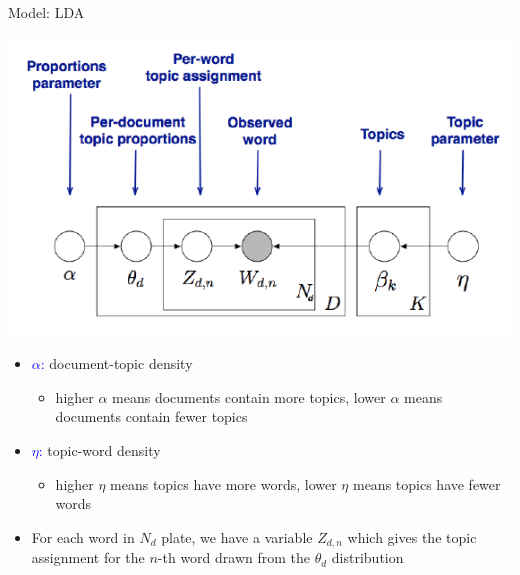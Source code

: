 \documentclass[english]{beamer}
\begin{document}
\begin{frame}{Model: LDA}
\begin{center}
\includegraphics[scale=0.4]{Images/platenotation2.png}
\end{center}
\begin{itemize}
\item \textcolor{blue}{$\alpha$:} document-topic density
\begin{itemize}
    \item higher $\alpha$ means documents contain more topics, lower $\alpha$ means documents contain fewer topics
\end{itemize}
\item \textcolor{blue}{$\eta$:} topic-word density
\begin{itemize}
    \item higher $\eta$ means topics have more words, lower $\eta$ means topics have fewer words
\end{itemize}
\item For each word in $N_d$ plate, we have a variable $Z_{d,n}$ which gives the topic assignment for the $n$-th word drawn from the $\theta_d$ distribution
\end{itemize}
\end{frame}
\end{document}
